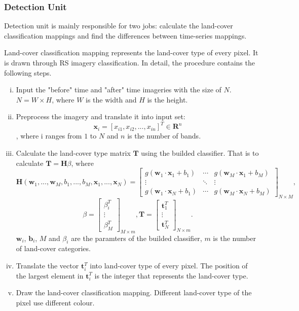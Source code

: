 \documentclass{elsart}
\begin{document}
\subsubsection{Detection Unit}
Detection unit is mainly responsible for two jobs: calculate the land-cover classification mappings and find the differences between time-series mappings.
\par
Land-cover classification mapping represents the land-cover type of every pixel.
It is drawn through RS imagery classification.
In detail, the procedure contains the following steps.
\begin{enumerate}[(i)]
\item Input the "before" time and "after" time imageries with the size of $N$. $N = W \times H$, where $W$ is the width and $H$ is the height.
\item Preprocess the imagery and translate it into input set: $$\mathbf{x}_i=\left[x_{i1},x_{i2},...,x_{in}  \right]^T \in \mathbf{R}^n$$, where i ranges from $1$ to $N$ and $n$ is the number of bands.
\item Calculate the land-cover type matrix $\mathbf{T}$ using the builded classifier. That is to calculate $\mathbf{T}=\mathbf{H}\beta$, where  
$$\mathbf{H}(\mathbf{w}_1,...,\mathbf{w}_M,b_1,...,b_M,\mathbf{x}_1,...,\mathbf{x}_N) = 
\begin{bmatrix}
g(\mathbf{w}_1 \cdot \mathbf{x}_1 + b_1) & \cdots & g(\mathbf{w}_M \cdot \mathbf{x}_1 + b_M) \\
\vdots & \ddots & \vdots \\
g(\mathbf{w}_1 \cdot \mathbf{x}_N + b_1) & \cdots & g(\mathbf{w}_M \cdot \mathbf{x}_N + b_M)
\end{bmatrix}_{N \times M}, 
$$
$$
\beta = \begin{bmatrix}\beta_i^T \\ \vdots \\ \beta_M^T \end{bmatrix}_{M \times m},  \mathbf{T} = \begin{bmatrix}\mathbf{t}_1^T \\ \vdots \\ \mathbf{t}_N^T \end{bmatrix}_{N \times m}. 
$$
$\mathbf{w}_i$, $\mathbf{b}_i$, $M$ and $\beta_i$ are the paramters of the builded classifier, $m$ is the number of land-cover categories.
\item Translate the vector $\mathbf{t}_i^T$ into land-cover type of every pixel. The position of the largest element in $\mathbf{t}_i^T$ is the integer that represents the land-cover type. 
\item Draw the land-cover classification mapping. Different land-cover type of the pixel use different colour.
\end{enumerate}
\par
\end{document}
